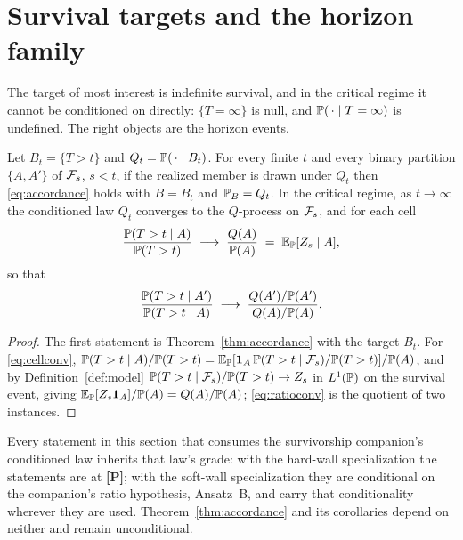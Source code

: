 \section{Survival targets and the horizon family}\label{sec:survival}

The target of most interest is indefinite survival, and in the critical
regime it cannot be conditioned on directly: $\{T=\infty\}$ is null, and
$\mathbb{P}(\,\cdot\mid T=\infty)$ is undefined. The right objects are the
horizon events.

\begin{theorem}\label{thm:horizon}
Let $B_t=\{T>t\}$ and $Q_t=\mathbb{P}(\,\cdot\mid B_t)$. For every finite $t$ and
every binary partition $\{A,A'\}$ of $\mathcal{F}_s$, $s<t$, if the realized member
is drawn under $Q_t$ then \eqref{eq:accordance} holds with $B=B_t$ and
$\mathbb{P}_B=Q_t$. In the critical regime, as $t\to\infty$ the conditioned law
$Q_t$ converges to the $Q$-process on $\mathcal{F}_s$, and for each cell
\begin{equation}\label{eq:cellconv}
\frac{\mathbb{P}(T>t\mid A)}{\mathbb{P}(T>t)}\;\longrightarrow\;\frac{Q(A)}{\mathbb{P}(A)}
\;=\;\mathbb{E}_{\mathbb{P}}[Z_s\mid A],
\end{equation}
so that
\begin{equation}\label{eq:ratioconv}
\frac{\mathbb{P}(T>t\mid A')}{\mathbb{P}(T>t\mid A)}\;\longrightarrow\;
\frac{Q(A')/\mathbb{P}(A')}{Q(A)/\mathbb{P}(A)}.
\end{equation}
\end{theorem}

\begin{proof}
The first statement is Theorem~\ref{thm:accordance} with the target
$B_t$. For \eqref{eq:cellconv},
$\mathbb{P}(T>t\mid A)/\mathbb{P}(T>t)=\mathbb{E}_{\mathbb{P}}[\mathbf{1}_A\,\mathbb{P}(T>t\mid\mathcal{F}_s)/\mathbb{P}(T>t)]/\mathbb{P}(A)$,
and by Definition~\ref{def:model} $\mathbb{P}(T>t\mid\mathcal{F}_s)/\mathbb{P}(T>t)\to Z_s$
in $L^1(\mathbb{P})$ on the survival event, giving $\mathbb{E}_{\mathbb{P}}[Z_s\mathbf{1}_A]/\mathbb{P}(A)
=Q(A)/\mathbb{P}(A)$; \eqref{eq:ratioconv} is the quotient of two instances.
\end{proof}

\begin{remark}\label{rem:grades}
Every statement in this section that consumes the survivorship
companion's conditioned law inherits that law's grade: with the
hard-wall specialization the statements are at \textbf{[P]}; with the
soft-wall specialization they are conditional on the companion's ratio
hypothesis, Ansatz~B, and carry that conditionality wherever they are
used. Theorem~\ref{thm:accordance} and its corollaries depend on neither
and remain unconditional.
\end{remark}


